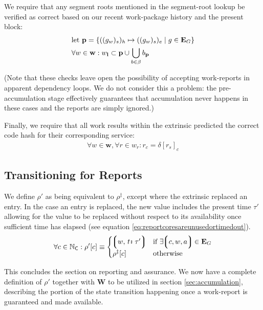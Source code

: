 We require that any segment roots mentioned in the segment-root lookup be verified as correct based on our recent work-package history and the present block:
\begin{align}
  &\text{let } \mathbf{p} = \{ ((g_w)_s)_h \mapsto ((g_w)_s)_e \mid g \in \mathbf{E}_G \} \\
  &\forall w \in \mathbf{w}: w_\mathbf{l} \subset \mathbf{p} \cup \bigcup_{b \in \beta} b_\mathbf{p}
\end{align}

(Note that these checks leave open the possibility of accepting work-reports in apparent dependency loops. We do not consider this a problem: the pre-accumulation stage effectively guarantees that accumulation never happens in these cases and the reports are simply ignored.)

Finally, we require that all work results within the extrinsic predicted the correct code hash for their corresponding service:
\begin{align}\label{eq:reportcodesarecorrect}
  \forall w \in \mathbf{w}, \forall r \in w_r : r_c = \delta[r_s]_c
\end{align}









\subsection{Transitioning for Reports}

We define $\rho'$ as being equivalent to $\rho^\ddagger$, except where the extrinsic replaced an entry. In the case an entry is replaced, the new value includes the present time $\tau'$ allowing for the value to be replaced without respect to its availability once sufficient time has elapsed (see equation \ref{eq:reportcoresareunusedortimedout}).
\begin{equation}
    \forall c \in \N_\mathsf{C} : \rho'[c] \equiv \begin{cases}
      \tup{w\ts\is{t}{\tau'}} &\when \exists \tup{c, w, a} \in \xtguarantees \\
      \rho^\ddagger[c] &\otherwise
    \end{cases}
\end{equation}

This concludes the section on reporting and assurance. We now have a complete definition of $\rho'$ together with $\mathbf{W}$ to be utilized in section \ref{sec:accumulation}, describing the portion of the state transition happening once a work-report is guaranteed and made available.
